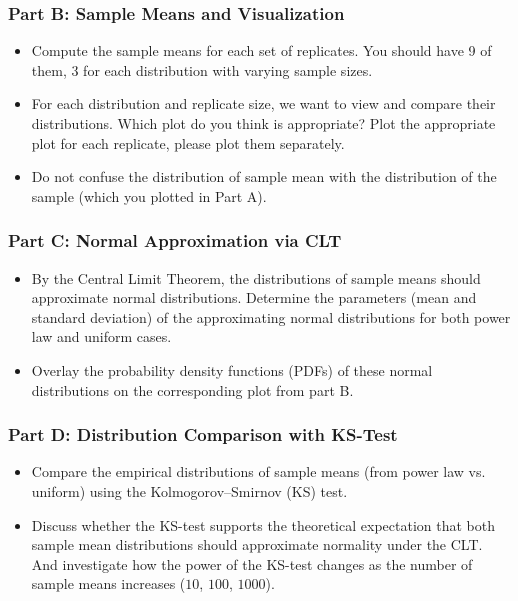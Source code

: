 \documentclass[11pt]{article}
\begin{document}
\subsubsection*{Part B: Sample Means and Visualization}
\begin{itemize}

    \item Compute the sample means for each set of replicates. You should have 9 of them, 3 for each distribution with varying sample sizes.
    \item For each distribution and replicate size, we want to view and compare their distributions. Which plot do you think is appropriate? Plot the appropriate plot for each replicate, please plot them separately. 
    \item Do not confuse the distribution of sample mean with the distribution of the sample (which you plotted in Part A).
\end{itemize}

\subsubsection*{Part C: Normal Approximation via CLT}
\begin{itemize}
    \item By the Central Limit Theorem, the distributions of sample means should approximate normal distributions. Determine the parameters (mean and standard deviation) of the approximating normal distributions for both power law and uniform cases.
    \item Overlay the probability density functions (PDFs) of these normal distributions on the corresponding plot from part B.
\end{itemize}

\subsubsection*{Part D: Distribution Comparison with KS-Test}
\begin{itemize}
    \item Compare the empirical distributions of sample means (from power law vs. uniform) using the Kolmogorov--Smirnov (KS) test.
    \item Discuss whether the KS-test supports the theoretical expectation that both sample mean distributions should approximate normality under the CLT. And investigate how the power of the KS-test changes as the number of sample means increases ($10$, $100$, $1000$).
\end{itemize}
\end{document}
